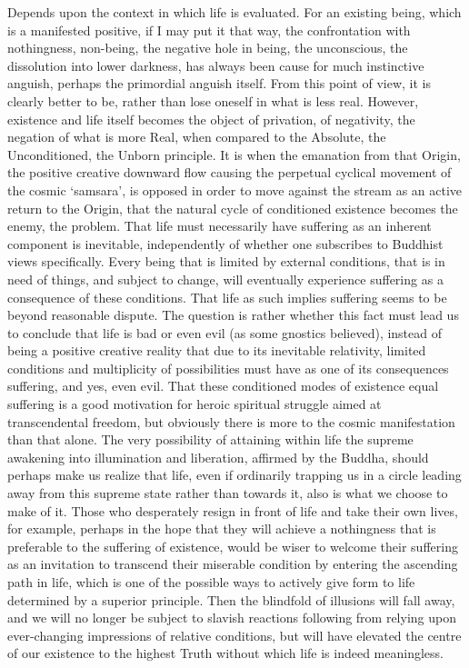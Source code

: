 \begin{footnotesize}
\begin{sffamily}
Depends upon the context in which life is evaluated. For an existing being, which is a manifested positive, if I may put
it that way, the confrontation with nothingness, non-being, the negative hole in being, the unconscious, the
dissolution into lower darkness, has always been cause for much instinctive anguish, perhaps the primordial anguish
itself. From this point of view, it is clearly better to be, rather than lose oneself in what is less real. However,
existence and life itself becomes the object of privation, of negativity, the negation of what is more Real, when
compared to the Absolute, the Unconditioned, the Unborn principle. It is when the emanation from that Origin, the
positive creative downward flow causing the perpetual cyclical movement of the cosmic `samsara’, is opposed in order to move against the stream as an active return to the Origin, that the natural cycle of
conditioned existence becomes the enemy, the problem. That life must necessarily have suffering as an inherent
component is inevitable, independently of whether one subscribes to Buddhist views specifically. Every being that is
limited by external conditions, that is in need of things, and subject to change, will eventually experience suffering
as a consequence of these conditions. That life as such implies suffering seems to be beyond reasonable dispute. The
question is rather whether this fact must lead us to conclude that life is bad or even evil (as some gnostics
believed), instead of being a positive creative reality that due to its inevitable relativity, limited conditions and
multiplicity of possibilities must have as one of its consequences suffering, and yes, even evil. That these
conditioned modes of existence equal suffering is a good motivation for heroic spiritual struggle aimed at
transcendental freedom, but obviously there is more to the cosmic manifestation than that alone. The very possibility
of attaining within life the supreme awakening into illumination and liberation, affirmed by the Buddha, should perhaps
make us realize that life, even if ordinarily trapping us in a circle leading away from this supreme state rather than
towards it, also is what we choose to make of it. Those who desperately resign in front of life and take their own
lives, for example, perhaps in the hope that they will achieve a nothingness that is preferable to the suffering of
existence, would be wiser to welcome their suffering as an invitation to transcend their miserable condition by
entering the ascending path in life, which is one of the possible ways to actively give form to life determined by a
superior principle. Then the blindfold of illusions will fall away, and we will no longer be subject to slavish
reactions following from relying upon ever-changing impressions of relative conditions, but will have elevated the
centre of our existence to the highest Truth without which life is indeed meaningless.



\end{sffamily}
\end{footnotesize}
